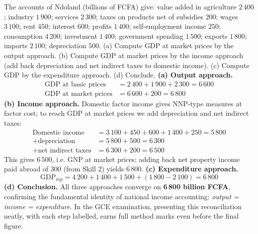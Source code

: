 \documentclass[11pt]{article}
\begin{document}
\begin{exoresolu}
The accounts of Ndoland (billions of FCFA) give: value added in agriculture $2\,400$; industry $1\,900$; services $2\,300$; taxes on products net of subsidies $200$; wages $3\,100$; rent $450$; interest $600$; profits $1\,400$; self-employment income $250$; consumption $4\,200$; investment $1\,400$; government spending $1\,500$; exports $1\,800$; imports $2\,100$; depreciation $500$.
(a) Compute GDP at market prices by the output approach. (b) Compute GDP at market prices by the income approach (add back depreciation and net indirect taxes to domestic income). (c) Compute GDP by the expenditure approach. (d) Conclude.
\tcblower
\textbf{(a) Output approach.}
\begin{align*}
\text{GDP at basic prices} &= 2\,400 + 1\,900 + 2\,300 = 6\,600\\
\text{GDP at market prices} &= 6\,600 + 200 = 6\,800
\end{align*}
\textbf{(b) Income approach.} Domestic factor income gives $\mathrm{NNP}$-type measures at factor cost; to reach GDP at market prices we add depreciation and net indirect taxes:
\begin{align*}
\text{Domestic income} &= 3\,100 + 450 + 600 + 1\,400 + 250 = 5\,800\\
+ \text{depreciation} &= 5\,800 + 500 = 6\,300\\
+ \text{net indirect taxes} &= 6\,300 + 200 = 6\,500
\end{align*}
This gives $6\,500$, i.e. GNP at market prices; adding back net property income paid abroad of $300$ (from Skill 2) yields $6\,800$.
\textbf{(c) Expenditure approach.}
\[ \mathrm{GDP}_{mp} = 4\,200 + 1\,400 + 1\,500 + (1\,800 - 2\,100) = 6\,800 \]
\textbf{(d) Conclusion.} All three approaches converge on \textbf{6\,800 billion FCFA}, confirming the fundamental identity of national income accounting: \emph{output = income = expenditure}. In the GCE examination, presenting this reconciliation neatly, with each step labelled, earns full method marks even before the final figure.
\end{exoresolu}
\end{document}
